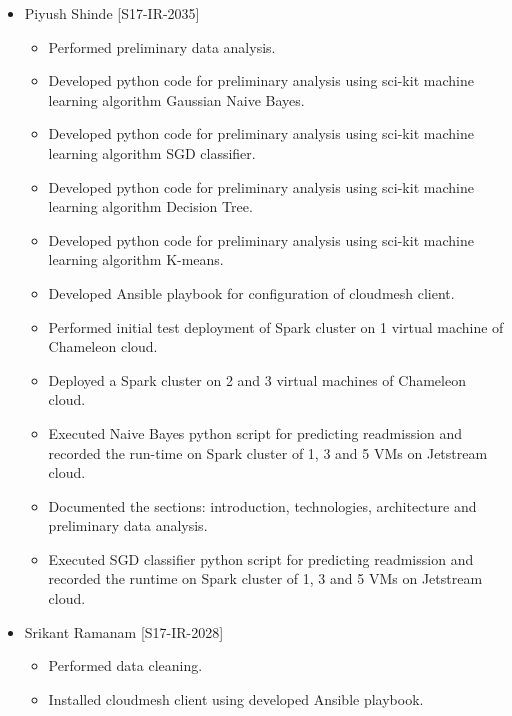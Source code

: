 \documentclass[9pt,twocolumn,twoside]{styles/osajnl}
\begin{document}
\begin{appendices}
\begin{itemize}
\begin{itemize}
    \end{itemize}
    \item Piyush Shinde [S17-IR-2035]
    \begin{itemize}
        \item Performed preliminary data analysis.
\item Developed python code for preliminary analysis using sci-kit machine learning algorithm Gaussian Naive Bayes.
\item Developed python code for preliminary analysis using sci-kit machine learning algorithm SGD classifier.
\item Developed python code for preliminary analysis using sci-kit machine learning algorithm Decision Tree.
\item Developed python code for preliminary analysis using sci-kit machine learning algorithm K-means.
\item Developed Ansible playbook for configuration of cloudmesh client.
\item Performed initial test deployment of Spark cluster on 1 virtual machine of Chameleon cloud.
\item Deployed a Spark cluster on 2 and 3 virtual machines of Chameleon cloud.
\item Executed Naive Bayes python script for predicting readmission and recorded the run-time on Spark cluster of 1, 3 and 5 VMs on Jetstream cloud.
\item Documented the sections: introduction, technologies, architecture and preliminary data analysis. 
\item Executed SGD classifier python script for predicting readmission and recorded the runtime on Spark cluster of 1, 3 and 5 VMs  on Jetstream cloud.
    \end{itemize}
    \item Srikant Ramanam [S17-IR-2028]
    \begin{itemize}
       \item Performed data cleaning.
      \item Installed cloudmesh client using developed Ansible playbook.
       

\end{itemize}
\end{itemize}
\end{appendices}
\end{document}
